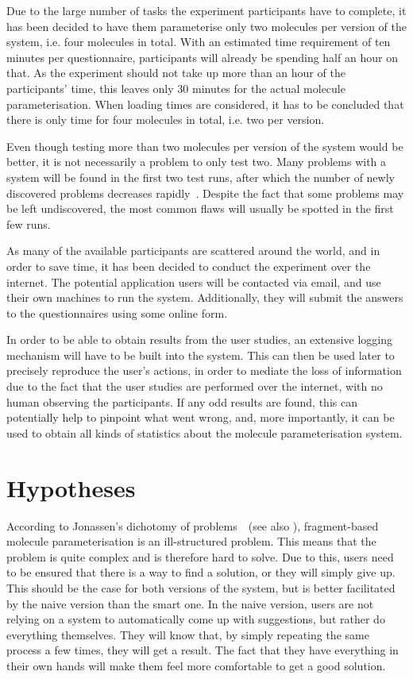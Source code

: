 Due to the large number of tasks the experiment participants have to complete, it has been decided to have them parameterise only two molecules per version of the system, i.e. four molecules in total. With an estimated time requirement of ten minutes per questionnaire, participants will already be spending half an hour on that. As the experiment should not take up more than an hour of the participants' time, this leaves only 30 minutes for the actual molecule parameterisation. When loading times are considered, it has to be concluded that there is only time for four molecules in total, i.e. two per version.

Even though testing more than two molecules per version of the system would be better, it is not necessarily a problem to only test two. Many problems with a system will be found in the first two test runs, after which the number of newly discovered problems decreases rapidly~\cite{krug2006dont}. Despite the fact that some problems may be left undiscovered, the most common flaws will usually be spotted in the first few runs.

As many of the available participants are scattered around the world, and in order to save time, it has been decided to conduct the experiment over the internet. The potential application users will be contacted via email, and use their own machines to run the system. Additionally, they will submit the answers to the questionnaires using some online form.

In order to be able to obtain results from the user studies, an extensive logging mechanism will have to be built into the system. This can then be used later to precisely reproduce the user's actions, in order to mediate the loss of information due to the fact that the user studies are performed over the internet, with no human observing the participants. If any odd results are found, this can potentially help to pinpoint what went wrong, and, more importantly, it can be used to obtain all kinds of statistics about the molecule parameterisation system.



\section{Hypotheses}
According to Jonassen's dichotomy of problems~\cite{jonassen2000toward}~(see also ), fragment-based molecule parameterisation is an ill-structured problem. This means that the problem is quite complex and is therefore hard to solve. Due to this, users need to be ensured that there is a way to find a solution, or they will simply give up. This should be the case for both versions of the system, but is better facilitated by the naive version than the smart one. In the naive version, users are not relying on a system to automatically come up with suggestions, but rather do everything themselves. They will know that, by simply repeating the same process a few times, they will get a result. The fact that they have everything in their own hands will make them feel more comfortable to get a good solution.


